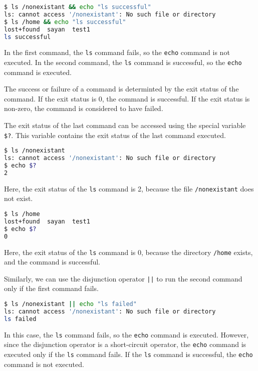\begin{lstlisting}[language=bash]
$ ls /nonexistant && echo "ls successful"
ls: cannot access '/nonexistant': No such file or directory
$ ls /home && echo "ls successful"
lost+found  sayan  test1
ls successful
\end{lstlisting}

In the first command, the \texttt{ls} command fails, so the \texttt{echo}
command is not executed. In the second command, the \texttt{ls} command
is successful, so the \texttt{echo} command is executed.

The success or failure of a command is determinted by the exit status
of the command. If the exit status is 0, the command is successful.
If the exit status is non-zero, the command is considered to have failed.

The exit status of the last command can be accessed using the special
variable \texttt{\$?}. This variable contains the exit status of the
last command executed.

\begin{lstlisting}[language=bash]
$ ls /nonexistant
ls: cannot access '/nonexistant': No such file or directory
$ echo $?
2
\end{lstlisting}

Here, the exit status of the \texttt{ls} command is 2, because the
file \texttt{/nonexistant} does not exist.

\begin{lstlisting}[language=bash]
$ ls /home
lost+found  sayan  test1
$ echo $?
0
\end{lstlisting}

Here, the exit status of the \texttt{ls} command is 0, because the
directory \texttt{/home} exists, and the command is successful.

Similarly, we can use the disjunction operator \texttt{||} to run
the second command only if the first command fails.

\begin{lstlisting}[language=bash]
$ ls /nonexistant || echo "ls failed"
ls: cannot access '/nonexistant': No such file or directory
ls failed
\end{lstlisting}

In this case, the \texttt{ls} command fails, so the \texttt{echo}
command is executed. However, since the disjunction operator is a
short-circuit operator, the \texttt{echo} command is executed only
if the \texttt{ls} command fails. If the \texttt{ls} command is
successful, the \texttt{echo} command is not executed.


